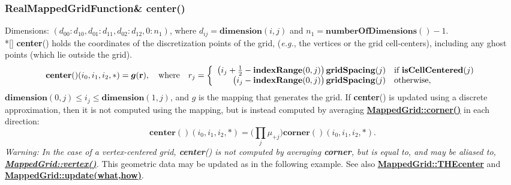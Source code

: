 \documentclass{article}
\begin{document}
  \subsubsection{RealMappedGridFunction\& center()}
  \label{MappedGrid::center()}
    Dimensions: $(d_{00}\colon d_{10},d_{01}\colon d_{11},d_{02}\colon d_{12},0\colon n_1)$,
    where $d_{ij} = \textbf{dimension}(i,j)$ and $n_1 = \textbf{numberOfDimensions}() - 1$. \\*[\parskip]
    \textbf{center}() holds the coordinates of the discretization points of the grid,
    ({\sl{}e.g.}, the vertices or the grid cell-centers), including any ghost points (which lie outside the grid).
    \[
      \textbf{center}()(i_0,i_1,i_2,\ast) = \mbox{\boldmath $g$}(\textbf{r}),
      \quad\mbox{where}\quad
      r_j = \left\{ \begin{array}{rl}
        \big(i_j + {1\over2} - \textbf{indexRange}(0,j)\big)\,\textbf{gridSpacing}(j) & \mbox{if \bf{}isCellCentered}(j) \\
        \big(i_j             - \textbf{indexRange}(0,j)\big)\,\textbf{gridSpacing}(j) & \mbox{otherwise},                \\
      \end{array} \right.
    \]
    $\textbf{dimension}(0,j) \le i_j \le \textbf{dimension}(1,j)$, and {\boldmath $g$} is the mapping that generates the grid.
    If \textbf{center}() is updated using a discrete approximation, then it is not computed using the mapping, but is instead
    computed by averaging {\bf{}\hyperref{corner()}{corner() \rm(\S}{)}{MappedGrid::corner()}} in each direction:
    \[
      \textbf{center}()(i_0,i_1,i_2,\ast) = \Big(\prod_j\mu_{+j}\Big)\textbf{corner}()(i_0,i_1,i_2,\ast).
    \]
    {\em Warning:  In the case of a vertex-centered grid, \textbf{center}() is not computed by averaging \textbf{corner}, but is
    equal to, and may be aliased to, {\bf{}\hyperref{vertex()}{vertex() \rm(\S}{)}{MappedGrid::vertex()}}.}
    This geometric data may be updated as in the following example.
    See also {\bf{}\hyperref{THEcenter}{THEcenter \rm(\S}{)}{MappedGrid::THEcenter}} and
    {\bf{}\hyperref{update(what,how)}{update(what,how) \rm(\S}{)}{MappedGrid::update(what,how)}}.
\end{document}
